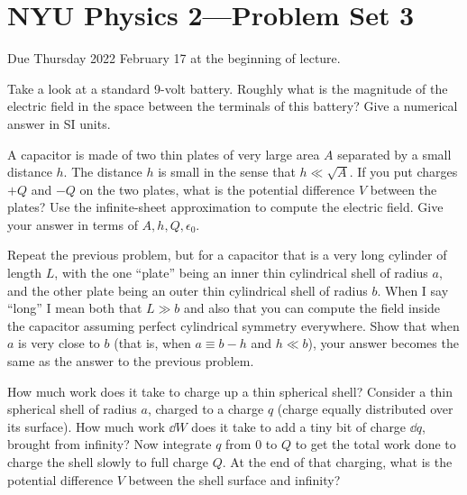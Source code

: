 \documentclass[12pt]{article}
\begin{document}
\section*{NYU Physics 2---Problem Set 3}

Due Thursday 2022 February 17 at the beginning of lecture.

\startproblem%
Take a look at a standard 9-volt battery.
Roughly what is the magnitude of the electric field in the space
between the terminals of this battery? Give a numerical answer in
SI units.

\startproblem%
A capacitor is made of two thin plates of very large area $A$
separated by a small distance $h$. The distance $h$ is small in the sense
that $h\ll \sqrt{A}$. If you put charges $+Q$ and $-Q$ on the
two plates, what is the potential difference $V$ between the plates?
Use the infinite-sheet approximation to compute the electric field.
Give your answer in terms of $A, h, Q, \epsilon_0$.

\startproblem%
Repeat the previous problem, but for a capacitor that is a very long
cylinder of length $L$, with the one ``plate'' being an inner thin
cylindrical shell of radius $a$, and the other plate being an outer
thin cylindrical shell of radius $b$. When I say ``long'' I mean both that
$L\gg b$ and also that you
can compute the field inside the capacitor assuming perfect
cylindrical symmetry everywhere. Show that when $a$ is very close to $b$ (that
is, when $a \equiv b - h$ and $h \ll b$), your answer becomes the same
as the answer to the previous problem.

\startproblem%
How much work does it take to charge up a thin spherical shell?
Consider a thin spherical shell of radius $a$, charged to a charge
$q$ (charge equally distributed over its surface). How much work
$\dd W$ does it take to add a tiny bit of charge $\dd q$, brought
from infinity? Now integrate $q$ from $0$ to $Q$ to get the total
work done to charge the shell slowly to full charge $Q$. At the
end of that charging, what is the potential difference $V$ between
the shell surface and infinity?
\end{document}
